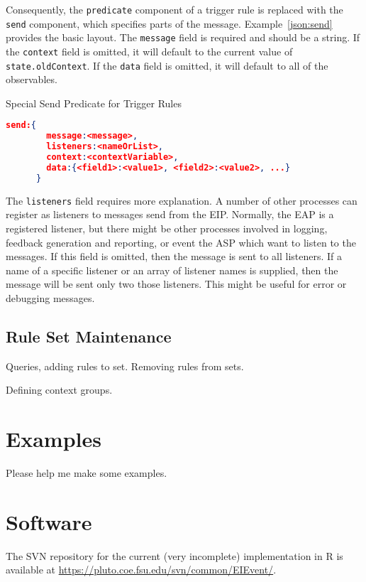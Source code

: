 \documentclass{article}
\begin{document}
  Consequently, the \texttt{predicate} component of a trigger rule is
  replaced with the \texttt{send} component, which specifies parts of
  the message.  Example~\ref{json:send} provides the basic layout.
  The \texttt{message} field is required and should be a string.  If
  the \texttt{context} field is omitted, it will default to the
  current value of \texttt{state.oldContext}.  If the \texttt{data}
  field is omitted, it will default to all of the observables.

  \begin{algorithm}
    \caption{Special Send Predicate for Trigger Rules}
    \label{json:send}
    \begin{lstlisting}[language=json]
      send:{
        message:<message>,
        listeners:<nameOrList>,
        context:<contextVariable>,
        data:{<field1>:<value1>, <field2>:<value2>, ...}
      }
    \end{lstlisting}
  \end{algorithm}

  The \texttt{listeners} field requires more explanation.  A number of
  other processes can register as listeners to messages send from the
  EIP.  Normally, the EAP is a registered listener, but there might be
  other processes involved in logging, feedback generation and
  reporting, or event the ASP which want to listen to the messages.
  If this field is omitted, then the message is sent to all
  listeners.  If a name of a specific listener or an array of listener
  names is supplied, then the message will be sent only two those
  listeners.  This might be useful for error or debugging messages.

  \subsection{Rule Set Maintenance}
  \label{sub:ruleSet}

  Queries, adding rules to set.  Removing rules from sets.

  Defining context groups.

  \section{Examples}
  \label{sec:examples}

  Please help me make some examples.
  
  \section{Software}
  \label{sec:software}

  The SVN repository for the current (very incomplete) implementation
  in R is available at
  \url{https://pluto.coe.fsu.edu/svn/common/EIEvent/}.

  
  
  
\end{document}
